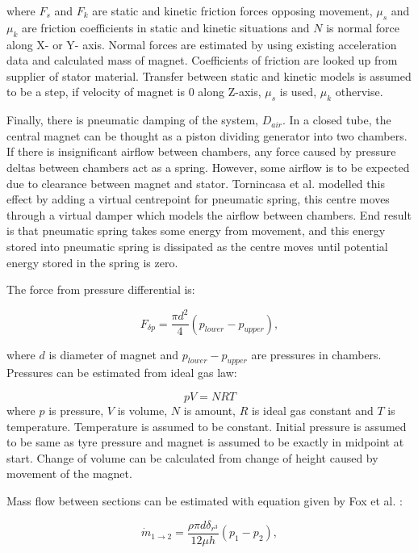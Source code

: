 where $F_s $ and $ F_k $ are static and kinetic friction forces opposing movement, $\mu_s$ and $\mu_k$ are friction coefficients in static and kinetic situations and $N$ is normal force along X- or Y- axis. Normal forces are estimated by using existing acceleration data and calculated mass of magnet. Coefficients of friction are looked up from supplier of stator material. Transfer between static and kinetic models is assumed to be a step, if velocity of magnet is 0 along Z-axis, $\mu_s$ is used, $\mu_k$ othervise.

Finally, there is pneumatic damping of the system, $D_{air}$. In a closed tube, the central magnet can be thought as a piston dividing generator into two chambers. If there is insignificant airflow between chambers, any force caused by pressure deltas between chambers act as a spring. However, some airflow is to be expected due to clearance between magnet and stator. Tornincasa et al. \cite{Tornincasa2012} modelled this effect by adding a virtual centrepoint for pneumatic spring, this centre moves through a virtual damper which models the airflow between chambers. End result is that pneumatic spring takes some energy from movement, and this energy stored into pneumatic spring is dissipated as the centre moves until potential energy stored in the spring is zero. 

The force from pressure differential is:

\begin{equation}
  F_{\delta p} = \frac{\pi d^2}{4}(p_{lower}-p_{upper}),
\end{equation}

where $d$ is diameter of magnet and $p_{lower}-p_{upper}$ are pressures in chambers. Pressures can be estimated from ideal gas law:

\begin{equation}
  pV = NRT
\end{equation}
where $p$ is pressure, $V$ is volume, $N$ is amount, $R$ is ideal gas constant and $T$ is temperature. Temperature is assumed to be constant. Initial pressure is assumed to be same as tyre pressure and magnet is assumed to be exactly in midpoint at start. Change of volume can be calculated from change of height caused by movement of the magnet. 

Mass flow between sections can be estimated with equation given by Fox et al. \cite{Fox2008}:

\begin{equation}
  \dot{m}_{1 \rightarrow 2} = \frac{\rho \pi d \delta_{r^3}}{12\mu h}(p_1-p_2),
\end{equation}


